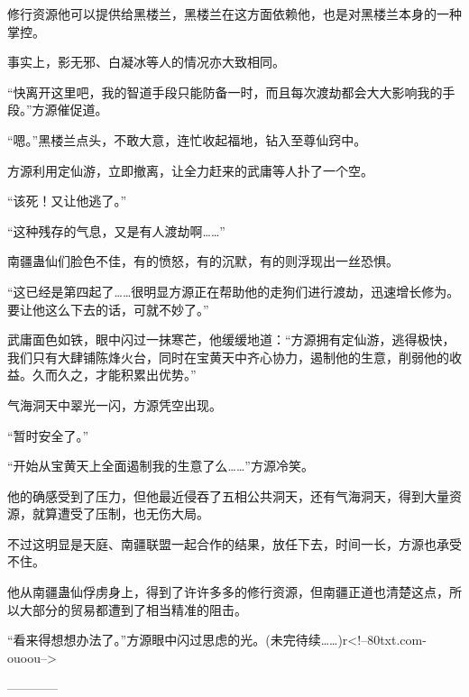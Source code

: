 \begin{this_body}
修行资源他可以提供给黑楼兰，黑楼兰在这方面依赖他，也是对黑楼兰本身的一种掌控。

事实上，影无邪、白凝冰等人的情况亦大致相同。

“快离开这里吧，我的智道手段只能防备一时，而且每次渡劫都会大大影响我的手段。”方源催促道。

“嗯。”黑楼兰点头，不敢大意，连忙收起福地，钻入至尊仙窍中。

方源利用定仙游，立即撤离，让全力赶来的武庸等人扑了一个空。

“该死！又让他逃了。”

“这种残存的气息，又是有人渡劫啊……”

南疆蛊仙们脸色不佳，有的愤怒，有的沉默，有的则浮现出一丝恐惧。

“这已经是第四起了……很明显方源正在帮助他的走狗们进行渡劫，迅速增长修为。要让他这么下去的话，可就不妙了。”

武庸面色如铁，眼中闪过一抹寒芒，他缓缓地道：“方源拥有定仙游，逃得极快，我们只有大肆铺陈烽火台，同时在宝黄天中齐心协力，遏制他的生意，削弱他的收益。久而久之，才能积累出优势。”

气海洞天中翠光一闪，方源凭空出现。

“暂时安全了。”

“开始从宝黄天上全面遏制我的生意了么……”方源冷笑。

他的确感受到了压力，但他最近侵吞了五相公共洞天，还有气海洞天，得到大量资源，就算遭受了压制，也无伤大局。

不过这明显是天庭、南疆联盟一起合作的结果，放任下去，时间一长，方源也承受不住。

他从南疆蛊仙俘虏身上，得到了许许多多的修行资源，但南疆正道也清楚这点，所以大部分的贸易都遭到了相当精准的阻击。

“看来得想想办法了。”方源眼中闪过思虑的光。(未完待续……)r<!--80txt.com-ouoou-->

------------

\end{this_body}

